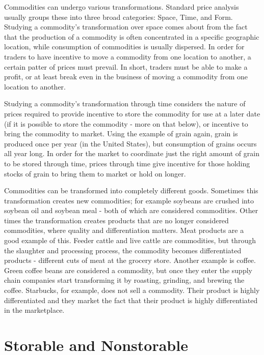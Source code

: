 \documentclass[
  letterpaper,
  DIV=11,
  numbers=noendperiod]{scrreprt}
\begin{document}
Commodities can undergo various transformations. Standard price analysis
usually groups these into three broad categories: Space, Time, and Form.
Studying a commodity's transformation over space comes about from the
fact that the production of a commodity is often concentrated in a
specific geographic location, while consumption of commodities is
usually dispersed. In order for traders to have incentive to move a
commodity from one location to another, a certain patter of prices must
prevail. In short, traders must be able to make a profit, or at least
break even in the business of moving a commodity from one location to
another.

Studying a commodity's transformation through time considers the nature
of prices required to provide incentive to store the commodity for use
at a later date (if it is possible to store the commodity - more on that
below), or incentive to bring the commodity to market. Using the example
of grain again, grain is produced once per year (in the United States),
but consumption of grains occurs all year long. In order for the market
to coordinate just the right amount of grain to be stored through time,
prices through time give incentive for those holding stocks of grain to
bring them to market or hold on longer.

Commodities can be transformed into completely different goods.
Sometimes this transformation creates new commodities; for example
soybeans are crushed into soybean oil and soybean meal - both of which
are considered commodities. Other times the transformation creates
products that are no longer considered commodities, where quality and
differentiation matters. Meat products are a good example of this.
Feeder cattle and live cattle are commodities, but through the slaughter
and processing process, the commodity becomes differentiated products -
different cuts of meat at the grocery store. Another example is coffee.
Green coffee beans are considered a commodity, but once they enter the
supply chain companies start transforming it by roasting, grinding, and
brewing the coffee. Starbucks, for example, does not sell a commodity.
Their product is highly differentiated and they market the fact that
their product is highly differentiated in the marketplace.

\hypertarget{storable-and-nonstorable}{%
\section{Storable and Nonstorable}\label{storable-and-nonstorable}}
\end{document}
